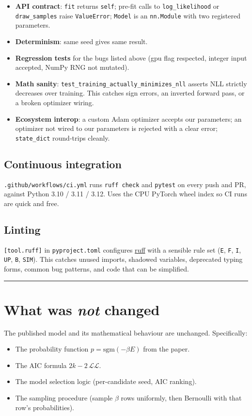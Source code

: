 \documentclass[11pt]{article}
\begin{document}
\begin{itemize}[leftmargin=*, itemsep=2pt]
  \item \textbf{API contract}: \texttt{fit} returns \texttt{self}; pre-fit calls to \texttt{log\_likelihood} or \texttt{draw\_samples} raise \texttt{ValueError}; \texttt{Model} is an \texttt{nn.Module} with two registered parameters.
  \item \textbf{Determinism}: same seed gives same result.
  \item \textbf{Regression tests} for the bugs listed above (gpu flag respected, integer input accepted, NumPy RNG not mutated).
  \item \textbf{Math sanity}: \texttt{test\_training\_actually\_minimizes\_nll} asserts NLL strictly decreases over training. This catches sign errors, an inverted forward pass, or a broken optimizer wiring.
  \item \textbf{Ecosystem interop}: a custom Adam optimizer accepts our parameters; an optimizer not wired to our parameters is rejected with a clear error; \texttt{state\_dict} round-trips cleanly.
\end{itemize}

\subsection{Continuous integration}

\texttt{.github/workflows/ci.yml} runs \texttt{ruff check} and \texttt{pytest}
on every push and PR, against Python 3.10 / 3.11 / 3.12. Uses the CPU PyTorch
wheel index so CI runs are quick and free.

\subsection{Linting}

\texttt{[tool.ruff]} in \texttt{pyproject.toml} configures
\href{https://docs.astral.sh/ruff/}{ruff} with a sensible rule set
(\texttt{E}, \texttt{F}, \texttt{I}, \texttt{UP}, \texttt{B}, \texttt{SIM}).
This catches unused imports, shadowed variables, deprecated typing forms,
common bug patterns, and code that can be simplified.

\bigskip
\hrule
\bigskip

\section{What was \emph{not} changed}

The published model and its mathematical behaviour are unchanged.
Specifically:
\begin{itemize}[leftmargin=*, itemsep=2pt]
  \item The probability function $p = \mathrm{sgm}(-\beta E)$ from the paper.
  \item The AIC formula $2k - 2\,\mathcal{LL}$.
  \item The model selection logic (per-candidate seed, AIC ranking).
  \item The sampling procedure (sample $\beta$ rows uniformly, then Bernoulli with that row's probabilities).
\end{itemize}
\end{document}
